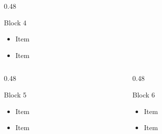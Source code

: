 \begin{frame}[t]
\begin{columns}[T,onlytextwidth]
\begin{column}{0.48\textwidth}
\begin{block}{Block 4}
\begin{itemize}
\item Item
\item Item
\end{itemize}
\end{block}
\end{column}
\end{columns}
\vspace{0.2cm}
\begin{columns}[T,onlytextwidth]
\begin{column}{0.48\textwidth}
\begin{block}{Block 5}
\begin{itemize}
\item Item
\item Item
\end{itemize}
\end{block}
\end{column}
\begin{column}{0.48\textwidth}
\begin{block}{Block 6}
\begin{itemize}
\item Item
\item Item
\end{itemize}
\end{block}
\end{column}
\end{columns}
\end{frame}

